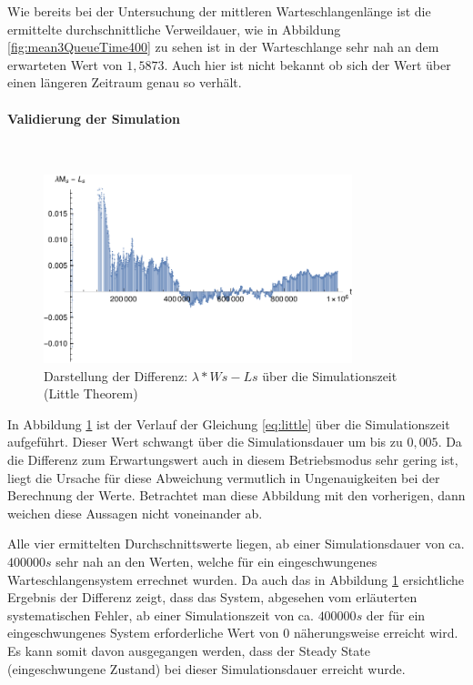 Wie bereits bei der Untersuchung der mittleren Warteschlangenlänge ist die ermittelte durchschnittliche Verweildauer, wie in Abbildung \ref{fig:mean3QueueTime400} zu sehen ist in der Warteschlange sehr nah an dem erwarteten Wert von $1,5873$. Auch hier ist nicht bekannt ob sich der Wert über einen längeren Zeitraum genau so verhält.
\paragraph{Validierung der Simulation}
\\
\begin{figure}[htpb]
	\centering
	\includegraphics[width=0.8\textwidth]{abbildungen/2_Phone_VIP/Arrival_400_Serve_100_dur_1000000_Skip_0/LittleSystem.pdf}
	\caption{Darstellung der Differenz: $\lambda * Ws - Ls$ über die Simulationszeit (Little Theorem)}
	\label{fig:Little3System400}
\end{figure}

In Abbildung \ref{fig:Little3System400} ist der Verlauf der Gleichung \ref{eq:little} über die Simulationszeit aufgeführt.
Dieser Wert schwangt über die Simulationsdauer um bis zu $0,005$. Da die Differenz zum Erwartungswert auch in diesem Betriebsmodus sehr gering ist, liegt die Ursache für diese Abweichung vermutlich in Ungenauigkeiten bei der Berechnung der Werte. Betrachtet man diese Abbildung mit den vorherigen, dann weichen diese Aussagen nicht voneinander ab.

Alle vier ermittelten Durchschnittswerte liegen, ab einer Simulationsdauer von ca. $400000s$ sehr nah an den Werten, welche für ein eingeschwungenes Warteschlangensystem errechnet wurden. Da auch das in Abbildung  \ref{fig:Little3System400} ersichtliche Ergebnis der Differenz zeigt, dass das System, abgesehen vom erläuterten systematischen Fehler, ab einer Simulationszeit von ca. $400000s$ der für ein eingeschwungenes System erforderliche Wert von $0$ näherungsweise erreicht wird. Es kann somit davon ausgegangen werden, dass der Steady State (eingeschwungene Zustand) bei dieser Simulationsdauer erreicht wurde.

